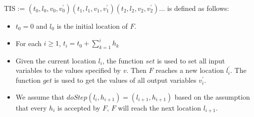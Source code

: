 TIS := $(t_{0},l_{0},v_{0},v_{0}^{\prime})(t_{1},l_{1},v_{1},v_{1}^{\prime})(t_{2},l_{2},v_{2},v_{2}^{\prime})...$ is
defined as follows:
\begin{itemize}
\item
$t_{0} = 0$ and $l_{0}$ is the initial location of $F$.
\item
For each $i \geqslant 1$, $t_{i} = t_{0} + \sum_{k = 1}^i h_{k}$
\item
Given the current location $l_{i}$, the function $set$ is used to set all input variables to the values specified by $v$. Then $F$ reaches a new location $l_{i}^{\prime}$. The function $get$ is used to get the values of all output variables $v_{i}^{\prime}$.
\item 
We assume that $doStep(l_{i}, h_{i+1}) = (l_{i+1},h_{i+1})$ based on the assumption that every $h_{i}$ is accepted by $F$, $F$ will reach the next location $l_{i+1}$.
\end{itemize}
